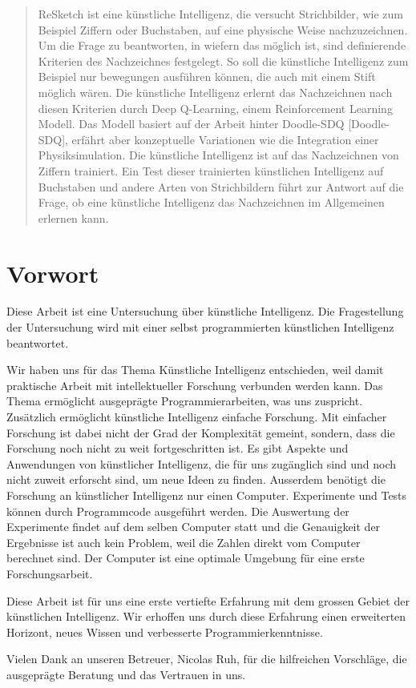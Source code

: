 \begin{abstract}
ReSketch ist eine künstliche Intelligenz, die versucht Strichbilder, wie zum
Beispiel Ziffern oder Buchstaben, auf eine physische Weise nachzuzeichnen. Um
die Frage zu beantworten, in wiefern das möglich ist, sind definierende
Kriterien des Nachzeichnes festgelegt. So soll die künstliche Intelligenz zum
Beispiel nur bewegungen ausführen können, die auch mit einem Stift möglich
wären. \newline
Die künstliche Intelligenz erlernt das Nachzeichnen nach diesen Kriterien durch
Deep Q-Learning, einem Reinforcement Learning Modell. Das Modell basiert auf der
Arbeit hinter Doodle-SDQ [Doodle-SDQ], erfährt aber konzeptuelle Variationen wie
die Integration einer Physiksimulation. Die künstliche Intelligenz ist auf das
Nachzeichnen von Ziffern trainiert. Ein Test dieser trainierten künstlichen Intelligenz auf
Buchstaben und andere Arten von Strichbildern führt zur Antwort auf die Frage,
ob eine künstliche Intelligenz das Nachzeichnen im Allgemeinen erlernen kann.
\end{abstract}

\newpage
\section*{Vorwort}
Diese Arbeit ist eine Untersuchung über künstliche Intelligenz. Die
Fragestellung der Untersuchung wird mit einer selbst programmierten künstlichen
Intelligenz beantwortet. 

Wir haben uns für das Thema Künstliche Intelligenz entschieden, weil damit
praktische Arbeit mit intellektueller Forschung verbunden werden kann. Das Thema
ermöglicht ausgeprägte Programmierarbeiten, was uns zuspricht. Zusätzlich
ermöglicht künstliche Intelligenz einfache Forschung. Mit einfacher Forschung
ist dabei nicht der Grad der Komplexität gemeint, sondern, dass die Forschung
noch nicht zu weit fortgeschritten ist. Es gibt Aspekte und Anwendungen von
künstlicher Intelligenz, die für uns zugänglich sind und noch nicht zuweit
erforscht sind, um neue Ideen zu finden. Ausserdem benötigt die Forschung an
künstlicher Intelligenz nur einen Computer. Experimente und Tests können durch
Programmcode ausgeführt werden. Die Auswertung der Experimente findet auf dem
selben Computer statt und die Genauigkeit der Ergebnisse ist auch kein Problem,
weil die Zahlen direkt vom Computer berechnet sind. Der Computer ist eine
optimale Umgebung für eine erste Forschungsarbeit.

Diese Arbeit ist für uns eine erste vertiefte Erfahrung mit dem grossen Gebiet
der künstlichen Intelligenz. Wir erhoffen uns durch diese Erfahrung einen
erweiterten Horizont, neues Wissen und verbesserte Programmierkenntnisse.

Vielen Dank an unseren Betreuer, Nicolas Ruh, für die hilfreichen Vorschläge,
die ausgeprägte Beratung und das Vertrauen in uns.

